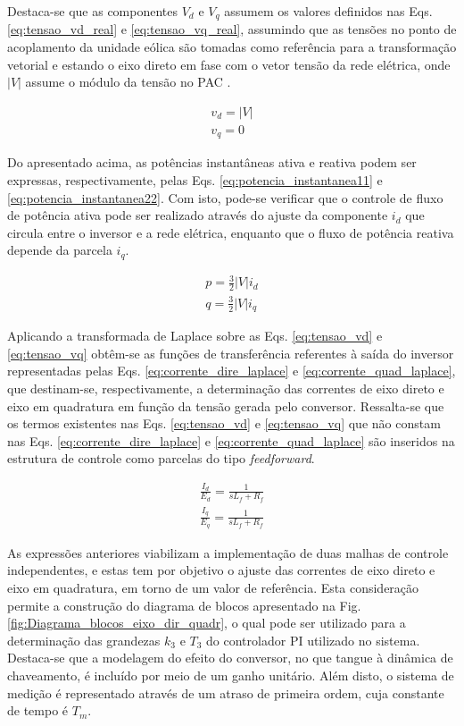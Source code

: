 Destaca-se que as componentes $V_d$ e $V_q$ assumem os valores definidos nas Eqs. \ref{eq:tensao_vd_real} e \ref{eq:tensao_vq_real}, assumindo que as tensões no ponto de acoplamento da unidade eólica são tomadas como referência para a transformação vetorial e estando o eixo direto em fase com o vetor tensão da rede elétrica, onde $|V|$ assume o módulo da tensão no PAC \cite{TeseProfAlex}. 

\begin{align}
	v_d = |V|\label{eq:tensao_vd_real}\\
	v_q = 0\label{eq:tensao_vq_real}
\end{align}

Do apresentado acima, as potências instantâneas ativa e reativa podem ser expressas, respectivamente, pelas Eqs. \ref{eq:potencia_instantanea11} e \ref{eq:potencia_instantanea22}. Com isto, pode-se verificar que o controle de fluxo de potência ativa pode ser realizado através do ajuste da componente $i_d$ que circula entre o inversor e a rede elétrica, enquanto que o fluxo de potência reativa depende da parcela $i_q$.

\begin{align}
	p = \frac{3}{2}|V|i_d\label{eq:potencia_instantanea11}\\
	q = \frac{3}{2}|V|i_q\label{eq:potencia_instantanea22}
\end{align}

Aplicando a transformada de Laplace sobre as Eqs. \ref{eq:tensao_vd} e \ref{eq:tensao_vq} obtêm-se as funções de transferência referentes à saída do inversor representadas pelas Eqs. \ref{eq:corrente_dire_laplace} e \ref{eq:corrente_quad_laplace}, que destinam-se, respectivamente, a determinação das correntes de eixo direto e eixo em quadratura em função da tensão gerada pelo conversor. Ressalta-se que os termos existentes nas Eqs. \ref{eq:tensao_vd} e \ref{eq:tensao_vq} que não constam nas Eqs. \ref{eq:corrente_dire_laplace} e \ref{eq:corrente_quad_laplace} são inseridos na estrutura de controle como parcelas do tipo \textit{feedforward}.

\begin{align}
	\frac{I_d}{E_d} = \frac{1}{sL_f + R_f}\label{eq:corrente_dire_laplace}\\
	\frac{I_q}{E_q} = \frac{1}{sL_f + R_f}\label{eq:corrente_quad_laplace}
\end{align}

As expressões anteriores viabilizam a implementação de duas malhas de controle independentes, e estas tem por objetivo o ajuste das correntes de eixo direto e eixo em quadratura, em torno de um valor de referência. Esta consideração permite a construção do diagrama de blocos apresentado na Fig. \ref{fig:Diagrama_blocos_eixo_dir_quadr}, o qual pode ser utilizado para a determinação das grandezas $k_3$ e $T_3$ do controlador PI utilizado no sistema. Destaca-se que a modelagem do efeito do conversor, no que tangue à dinâmica de chaveamento, é incluído por meio de um ganho unitário. Além disto, o sistema de medição é representado através de um atraso de primeira ordem, cuja constante de tempo é $T_m$.

